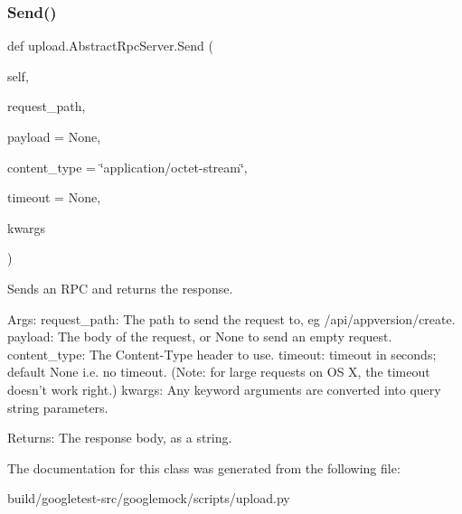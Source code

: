 \subsubsection{\texorpdfstring{Send()}{Send()}\hspace{0.1cm}{\footnotesize\ttfamily [2/2]}}
{\footnotesize\ttfamily def upload.\+Abstract\+Rpc\+Server.\+Send (\begin{DoxyParamCaption}\item[{}]{self,  }\item[{}]{request\+\_\+path,  }\item[{}]{payload = {\ttfamily None},  }\item[{}]{content\+\_\+type = {\ttfamily \char`\"{}application/octet-\/stream\char`\"{}},  }\item[{}]{timeout = {\ttfamily None},  }\item[{}]{kwargs }\end{DoxyParamCaption})}

\begin{DoxyVerb}Sends an RPC and returns the response.

Args:
  request_path: The path to send the request to, eg /api/appversion/create.
  payload: The body of the request, or None to send an empty request.
  content_type: The Content-Type header to use.
  timeout: timeout in seconds; default None i.e. no timeout.
(Note: for large requests on OS X, the timeout doesn't work right.)
  kwargs: Any keyword arguments are converted into query string parameters.

Returns:
  The response body, as a string.
\end{DoxyVerb}
 

The documentation for this class was generated from the following file\+:\begin{DoxyCompactItemize}
\item 
build/googletest-\/src/googlemock/scripts/upload.\+py\end{DoxyCompactItemize}
